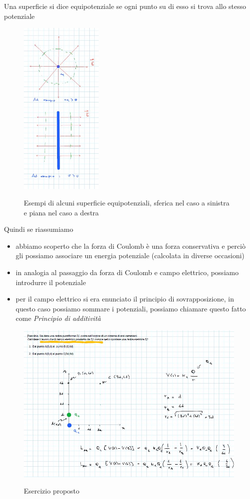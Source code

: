 \begin{definizione}
	Una superficie si dice equipotenziale se ogni punto su di esso si trova allo stesso potenziale
\end{definizione}

	\begin{figure}[h]
	\begin{center}
		\includegraphics[width=4cm]{lezione8/images/13 Elettrostatica, Il potenziale elettrico}\\
		\caption{Esempi di alcuni superficie equipotenziali, sferica nel caso a sinistra e piana nel caso a destra}
	\end{center}
\end{figure}


Quindi se riassumiamo 
\begin{itemize}
\item abbiamo scoperto che la forza di Coulomb è una forza conservativa e perciò gli possiamo associare un energia potenziale (calcolata in diverse occasioni)
\item in analogia al passaggio da forza di Coulomb e campo elettrico, possiamo introdurre il potenziale
\item per il campo elettrico si era enunciato il principio di sovrapposizione, in questo caso possiamo sommare i potenziali, possiamo chiamare questo fatto come \textit{Principio di additività} 
\end{itemize}

\begin{figure}[h]
	\begin{center}
		\includegraphics[width=12cm]{lezione8/images/14 Elettrostatica, Il potenziale elettrico}\\
		\caption{Esercizio proposto}
	\end{center}
\end{figure}
